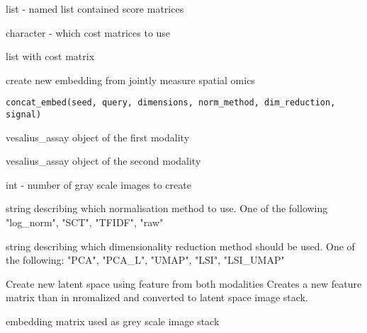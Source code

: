 \documentclass[a4paper]{book}
\begin{document}
%
\begin{Arguments}
\begin{ldescription}
\item[\code{cost}] list - named list contained score matrices

\item[\code{use\_cost}] character - which cost matrices to use
\end{ldescription}
\end{Arguments}
%
\begin{Value}
list with cost matrix
\end{Value}
%
\begin{Description}
create new embedding from jointly measure spatial omics
\end{Description}
%
\begin{Usage}
\begin{verbatim}
concat_embed(seed, query, dimensions, norm_method, dim_reduction, signal)
\end{verbatim}
\end{Usage}
%
\begin{Arguments}
\begin{ldescription}
\item[\code{seed}] vesalius\_assay object of the first modality

\item[\code{query}] vesalius\_assay object of the second modality

\item[\code{dimensions}] int - number of gray scale images to create

\item[\code{norm\_method}] string describing which normalisation 
method to use. One of the following "log\_norm", "SCT", "TFIDF", "raw"

\item[\code{dim\_reduction}] string describing which dimensionality
reduction method should be used. One of the following:
"PCA", "PCA\_L", "UMAP", "LSI", "LSI\_UMAP"
\end{ldescription}
\end{Arguments}
%
\begin{Details}
Create new latent space using feature from both modalities
Creates a new feature matrix than in nromalized and converted to latent
space image stack.
\end{Details}
%
\begin{Value}
embedding matrix used as grey scale image stack
\end{Value}
\end{document}
